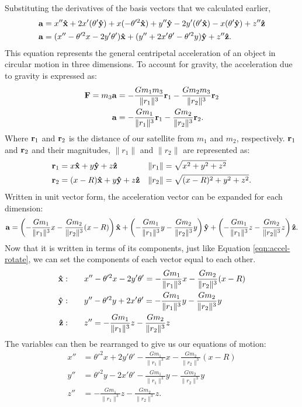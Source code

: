 \begin{samepage}
Substituting the derivatives of the basis vectors that we calculated earlier,
\begin{align}
	\bvec{a} &= x''\uvec{x} + 2x'(\theta'\uvec{y}) + x(- \theta'^2\uvec{x}) + y''\uvec{y} - 2y'(\theta'\uvec{x}) - x(\theta'\uvec{y}) + z''\uvec{z} \nonumber \\
	\bvec{a} &= (x'' - \theta'^2x - 2y'\theta')\uvec{x} + (y'' + 2x'\theta' - \theta'^2y)\uvec{y} + z''\uvec{z} \label{eqn:accel-rotate} \text{.}
\end{align}
This equation represents the general centripetal acceleration of an object in circular motion in three dimensions.
To account for gravity, the acceleration due to gravity is expressed as:
\begin{align*}
	\bm{\mathbf{F}} = m_3\bm{\mathbf{a}} &= - \frac{Gm_1m_3}{\|r_1\|^3}\bm{\mathbf{r}}_1 - \frac{Gm_2m_3}{\|r_2\|^3}\bm{\mathbf{r}}_2 \\
	\bm{\mathbf{a}} &= - \frac{Gm_1}{\|r_1\|^3}\bm{\mathbf{r}}_1 - \frac{Gm_2}{\|r_2\|^3}\bm{\mathbf{r}}_2 \text{.}
\end{align*}
Where $\bm{\mathbf{r}}_1$ and $\bm{\mathbf{r}}_2$ is the distance of our satellite from $m_1$ and $m_2$, respectively.
$\bm{\mathbf{r}}_1$ and $\bm{\mathbf{r}}_2$ and their magnitudes, $\|r_1\|$ and $\|r_2\|$ are represented as:
\begin{align*}
	\bvec{r}_1 &= x\uvec{x} + y\uvec{y} + z\uvec{z} & \|r_1\| &= \sqrt{x^2 + y^2 + z^2} \\
	\bvec{r}_2 &= (x - R)\uvec{x} + y\uvec{y} + z\uvec{z} & \|r_2\| &= \sqrt{(x - R)^2 + y^2 + z^2} \text{.}
\end{align*}
Written in unit vector form, the acceleration vector can be expanded for each dimension:
\begin{equation*}
	\bvec{a} = \left(-\frac{Gm_1}{\|r_1\|^3}x - \frac{Gm_2}{\|r_2\|^3}(x - R)\right)\uvec{x} + \left(-\frac{Gm_1}{\|r_1\|^3}y - \frac{Gm_2}{\|r_2\|^3}y\right)\uvec{y} + \left(-\frac{Gm_1}{\|r_1\|^3}z - \frac{Gm_2}{\|r_2\|^3}z\right)\uvec{z} \text{.}
\end{equation*}
Now that it is written in terms of its components, just like Equation \eqref{eqn:accel-rotate}, we can set the components of each vector equal to each other.
\begin{align*}
	\uvec{x} : \qquad &x'' - \theta'^2x - 2y'\theta' = -\frac{Gm_1}{\|r_1\|^3}x - \frac{Gm_2}{\|r_2\|^3}(x - R) \\
	\uvec{y} : \qquad &y'' - \theta'^2y + 2x'\theta' = -\frac{Gm_1}{\|r_1\|^3}y - \frac{Gm_2}{\|r_2\|^3}y \\
	\uvec{z} : \qquad &z'' = -\frac{Gm_1}{\|r_1\|^3}z - \frac{Gm_2}{\|r_2\|^3}z
\end{align*}
The variables can then be rearranged to give us our equations of motion:
\begin{align}
	x'' &= \theta'^2x + 2y'\theta' -\frac{Gm_1}{\|r_1\|^3}x - \frac{Gm_2}{\|r_2\|^3}(x - R) \label{eqn:eomx}\\
	y'' &= \theta'^2y - 2x'\theta' -\frac{Gm_1}{\|r_1\|^3}y - \frac{Gm_2}{\|r_2\|^3}y \label{eqn:eomy}\\
	z'' &= -\frac{Gm_1}{\|r_1\|^3}z - \frac{Gm_2}{\|r_2\|^3}z \label{eqn:eomz}\text{.}
\end{align}
\end{samepage}

